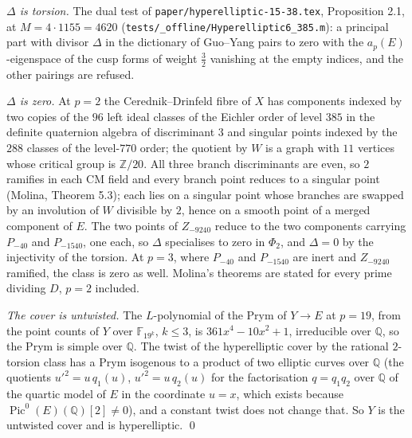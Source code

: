 \documentclass[11pt,reqno]{amsart}
\theoremstyle{plain}
\theoremstyle{definition}
\DeclareMathOperator{\Pic}{Pic}
\newcommand{\Q}{\mathbb{Q}}
\newcommand{\Z}{\mathbb{Z}}
\begin{document}
\emph{$\Delta$ is torsion.} The dual test of \texttt{paper/hyperelliptic-15-38.tex}, Proposition 2.1, at
$M=4\cdot1155=4620$ (\texttt{tests/\_offline/Hyperelliptic6\_385.m}): a principal part with divisor $\Delta$ in the
dictionary of Guo--Yang pairs to zero with the $a_p(E)$-eigenspace of the cusp forms of weight $\tfrac32$
vanishing at the empty indices, and the other pairings are refused.

\emph{$\Delta$ is zero.} At $p=2$ the Cerednik--Drinfeld fibre of $X$ has components indexed by two copies of
the $96$ left ideal classes of the Eichler order of level $385$ in the definite quaternion algebra of
discriminant $3$ and singular points indexed by the $288$ classes of the level-$770$ order; the quotient by $W$
is a graph with $11$ vertices whose critical group is $\Z/20$. All three branch discriminants are even, so $2$
ramifies in each CM field and every branch point reduces to a singular point (Molina, Theorem 5.3); each lies on a
singular point whose branches are swapped by an involution of $W$ divisible by $2$, hence on a smooth point of a
merged component of $E$. The two points of $Z_{-9240}$ reduce to the two components carrying $P_{-40}$ and
$P_{-1540}$, one each, so $\Delta$ specialises to zero in $\Phi_2$, and $\Delta=0$ by the injectivity of the
torsion. At $p=3$, where $P_{-40}$ and $P_{-1540}$ are inert and $Z_{-9240}$ ramified, the class is zero as well.
Molina's theorems are stated for every prime dividing $D$, $p=2$ included.

\emph{The cover is untwisted.} The $L$-polynomial of the Prym of $Y\to E$ at $p=19$, from the point counts of
$Y$ over $\mathbb{F}_{19^k}$, $k\le3$, is $361x^4-10x^2+1$, irreducible over $\Q$, so the Prym is simple over
$\Q$. The twist of the hyperelliptic cover by the rational $2$-torsion class has a Prym isogenous to a product of
two elliptic curves over $\Q$ (the quotients $u'^2=u\,q_1(u)$, $u'^2=u\,q_2(u)$ for the factorisation
$q=q_1q_2$ over $\Q$ of the quartic model of $E$ in the coordinate $u=x$, which exists because
$\Pic^0(E)(\Q)[2]\neq0$), and a constant twist does not change that. So $Y$ is the untwisted cover and is
hyperelliptic. \qed
\end{document}

